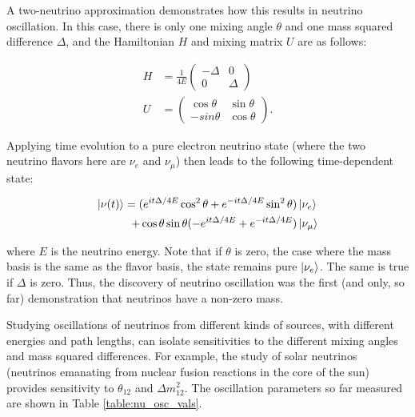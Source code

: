A two-neutrino approximation demonstrates how this results in neutrino oscillation.  In this case, there is only one mixing angle $\theta$ and one mass squared difference $\Delta$, and the Hamiltonian $H$ and mixing matrix $U$ are as follows:

\begin{equation}
\begin{aligned}
H &= \frac{1}{4 E} \begin{pmatrix}
-\Delta & 0 \\
0 & \Delta
\end{pmatrix} \\
U &= \begin{pmatrix}
\cos \theta & \sin \theta \\
-sin \theta & \cos \theta
\end{pmatrix}.
\end{aligned}
\end{equation}

\noindent
Applying time evolution to a pure electron neutrino state (where the two neutrino flavors here are $\nu_{e}$ and $\nu_{\mu}$) then leads to the following time-dependent state:

\begin{equation}
\begin{aligned}
\ket{\nu(t)} = (e^{i t \Delta / 4 E} \cos^{2} \theta + e^{-i t \Delta / 4 E} \sin^{2} \theta) &\ket{\nu_{e}} \\ + \cos \theta \sin \theta (-e^{i t \Delta / 4 E} + e^{-i t \Delta / 4 E}) &\ket{\nu_{\mu}}
\end{aligned}
\label{eqn:oscilprob}
\end{equation}

\noindent
where $E$ is the neutrino energy.  Note that if $\theta$ is zero, the case where the mass basis is the same as the flavor basis, the state remains pure $\ket{\nu_{e}}$.  The same is true if $\Delta$ is zero.  Thus, the discovery of neutrino oscillation was the first (and only, so far) demonstration that neutrinos have a non-zero mass.

Studying oscillations of neutrinos from different kinds of sources, with different energies and path lengths, can isolate sensitivities to the different mixing angles and mass squared differences.  For example, the study of solar neutrinos (neutrinos emanating from nuclear fusion reactions in the core of the sun) provides sensitivity to $\theta_{12}$ and $\Delta m_{12}^{2}$.  The oscillation parameters so far measured are shown in Table  \ref{table:nu_osc_vals}.

